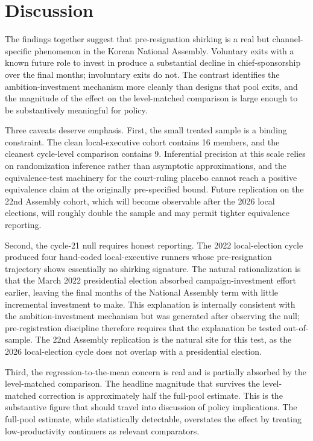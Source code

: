 \documentclass[11pt]{article}
\begin{document}
\section{Discussion}\label{sec:discussion}

The findings together suggest that pre-resignation shirking is a real but channel-specific phenomenon in the Korean National Assembly. Voluntary exits with a known future role to invest in produce a substantial decline in chief-sponsorship over the final months; involuntary exits do not. The contrast identifies the ambition-investment mechanism more cleanly than designs that pool exits, and the magnitude of the effect on the level-matched comparison is large enough to be substantively meaningful for policy.

Three caveats deserve emphasis. First, the small treated sample is a binding constraint. The clean local-executive cohort contains 16 members, and the cleanest cycle-level comparison contains 9. Inferential precision at this scale relies on randomization inference rather than asymptotic approximations, and the equivalence-test machinery for the court-ruling placebo cannot reach a positive equivalence claim at the originally pre-specified bound. Future replication on the 22nd Assembly cohort, which will become observable after the 2026 local elections, will roughly double the sample and may permit tighter equivalence reporting.

Second, the cycle-21 null requires honest reporting. The 2022 local-election cycle produced four hand-coded local-executive runners whose pre-resignation trajectory shows essentially no shirking signature. The natural rationalization is that the March 2022 presidential election absorbed campaign-investment effort earlier, leaving the final months of the National Assembly term with little incremental investment to make. This explanation is internally consistent with the ambition-investment mechanism but was generated after observing the null; pre-registration discipline therefore requires that the explanation be tested out-of-sample. The 22nd Assembly replication is the natural site for this test, as the 2026 local-election cycle does not overlap with a presidential election.

Third, the regression-to-the-mean concern is real and is partially absorbed by the level-matched comparison. The headline magnitude that survives the level-matched correction is approximately half the full-pool estimate. This is the substantive figure that should travel into discussion of policy implications. The full-pool estimate, while statistically detectable, overstates the effect by treating low-productivity continuers as relevant comparators.
\end{document}
